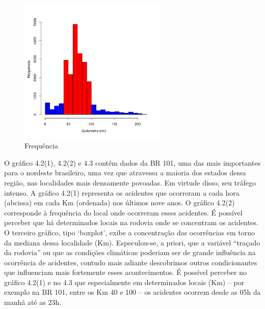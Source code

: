 \quad \quad
\begin{figure}[h]
	\centering
	\caption{ Frequência}
	\includegraphics[width=7cm,height=7cm]{Figuras/Preprocess/br101_4.png}
\end{figure}

O gráfico 4.2(1), 4.2(2)  e 4.3 contêm dados da BR 101, uma das mais importantes para o nordeste brasileiro, uma vez que atravessa a maioria dos estados dessa região, nas localidades mais densamente povoadas. Em virtude disso, seu tráfego intenso. 
A gráfico 4.2(1) representa os acidentes que ocorreram a cada hora (abcissa) em cada Km (ordenada) nos últimos nove anos. 
O  gráfico 4.2(2) corresponde à frequência do local onde ocorreram esses acidentes. 
É possível perceber que há determinados locais na rodovia onde se concentram os acidentes. 
O terceiro gráfico, tipo ‘boxplot’, exibe a concentração das ocorrências em torno da mediana dessa localidade (Km). 
Especulou-se, a priori, que a variável “traçado da rodovia” ou que as condições climáticas poderiam ser de grande influência na ocorrência de acidentes, contudo mais adiante descobrimos outros condicionantes que influenciam mais fortemente esses acontecimentos. 
É possível perceber no gráfico 4.2(1) e no 4.3 que especialmente em determinados locais (Km) -- por exemplo na BR 101, entre os Km 40 e 100 -- os acidentes ocorrem desde as 05h da manhã até as 23h. 



